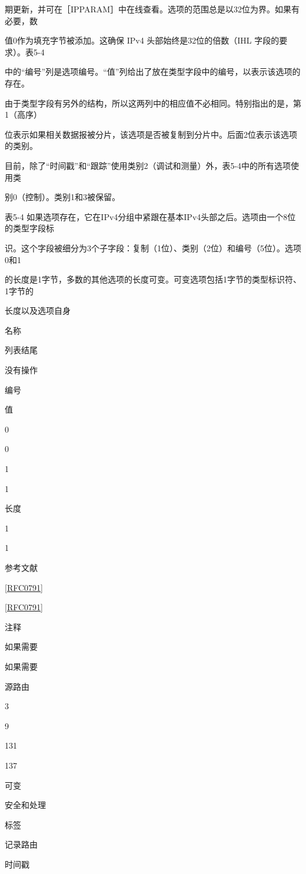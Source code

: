 期更新，并可在［IPPARAM］中在线查看。选项的范围总是以32位为界。如果有必要，数

值0作为填充字节被添加。这确保 IPv4 头部始终是32位的倍数（IHL 字段的要求）。表5-4

中的“编号”列是选项编号。“值”列给出了放在类型字段中的编号，以表示该选项的存在。

由于类型字段有另外的结构，所以这两列中的相应值不必相同。特别指出的是，第1（高序）

位表示如果相关数据报被分片，该选项是否被复制到分片中。后面2位表示该选项的类别。

目前，除了“时间戳”和“跟踪”使用类别2（调试和测量）外，表5-4中的所有选项使用类

别0（控制）。类别1和3被保留。

表5-4 如果选项存在，它在IPv4分组中紧跟在基本IPv4头部之后。选项由一个8位的类型字段标

识。这个字段被细分为3个子字段：复制（1位）、类别（2位）和编号（5位）。选项0和1

的长度是1字节，多数的其他选项的长度可变。可变选项包括1字节的类型标识符、1字节的

长度以及选项自身

名称

列表结尾

没有操作

编号

值

0

0

1

1

长度

1

1

参考文献

\href{https://www.rfc-editor.org/rfc/rfc0791}{[RFC0791]}

\href{https://www.rfc-editor.org/rfc/rfc0791}{[RFC0791]}

注释

如果需要

如果需要

源路由

3

9

131

137

可变

安全和处理

标签

记录路由

时间戳

